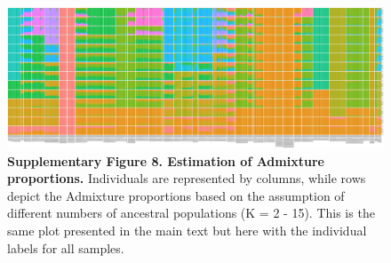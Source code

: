 \documentclass[twoside, british, a4paper]{article}
\begin{document}
\begin{landscape}
\thispagestyle{mylandscape}
\begin{figure}
\centering
\includegraphics[width=1.5\textwidth]{../FPG--Pipeline/FPG--Plots/FPG--ngsAdmix/FPG--ngsAdmix_Labels-RColours.pdf}
\captionsetup{labelformat=empty}
\caption[Supplementary Figure 8. Estimation of Admixture proportions.]{\textbf{Supplementary Figure 8. Estimation of Admixture proportions.} Individuals are represented by columns, while rows depict the Admixture proportions based on the assumption of different numbers of ancestral populations (K = 2 - 15). This is the same plot presented in the main text but here with the individual labels for all samples.}
\label{MainText:FPG--ngsAdmix_Labels}
\end{figure}
\end{landscape}
\end{document}
